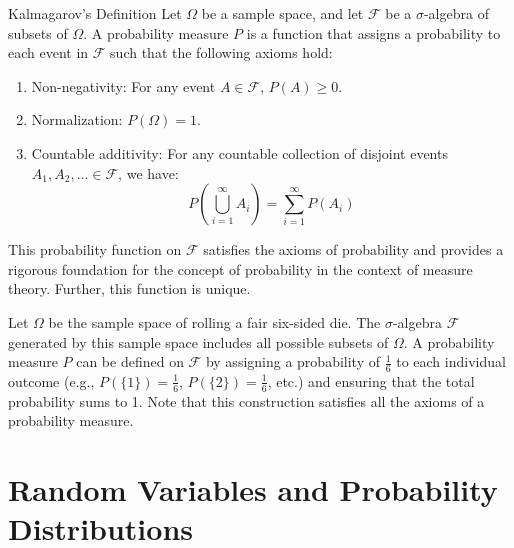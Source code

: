 \documentclass[openany]{book}
\begin{document}
\begin{mydefinition}{Kalmagarov's Definition}
    Let $\Omega$ be a sample space, and let $\mathcal{F}$ be a $\sigma$-algebra of subsets of $\Omega$. A probability measure $P$ is a function that assigns a probability to each event in $\mathcal{F}$ such that the following axioms hold:
    \begin{enumerate}
        \item Non-negativity: For any event $A \in \mathcal{F}$, $P(A) \geq 0$.
        \item Normalization: $P(\Omega) = 1$.
        \item Countable additivity: For any countable collection of disjoint events $A_1, A_2, \ldots \in \mathcal{F}$, we have:
        $$P\left(\bigcup_{i=1}^{\infty} A_i\right) = \sum_{i=1}^{\infty} P(A_i)$$
    \end{enumerate}
    This probability function on $\mathcal{F}$ satisfies the axioms of probability and provides a rigorous foundation for the concept of probability in the context of measure theory. Further, this function is unique. 
\end{mydefinition}
\begin{example}
    Let $\Omega$ be the sample space of rolling a fair six-sided die. The $\sigma$-algebra $\mathcal{F}$ generated by this sample space includes all possible subsets of $\Omega$. A probability measure $P$ can be defined on $\mathcal{F}$ by assigning a probability of $\frac{1}{6}$ to each individual outcome (e.g., $P(\{1\}) = \frac{1}{6}$, $P(\{2\}) = \frac{1}{6}$, etc.) and ensuring that the total probability sums to 1. Note that this construction satisfies all the axioms of a probability measure.
\end{example}

\section{Random Variables and Probability Distributions}
\end{document}
